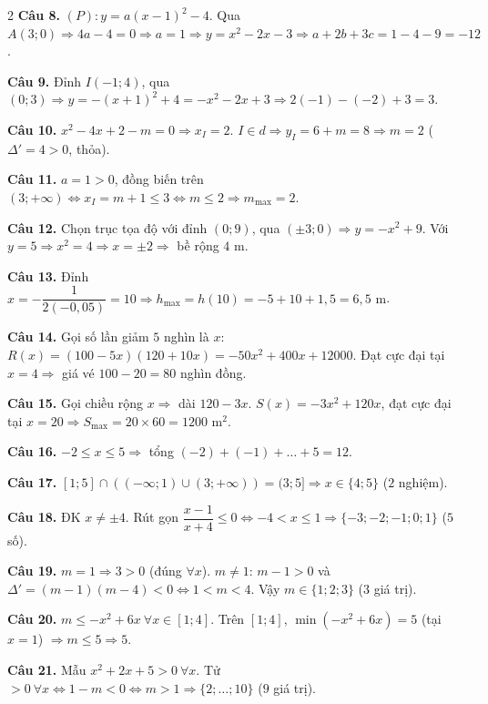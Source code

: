 \documentclass[12pt,a4paper]{article}
\begin{document}
\begin{multicols}{2}
\textbf{Câu 8.} $(P): y = a(x - 1)^2 - 4$. Qua $A(3; 0) \Rightarrow 4a - 4 = 0 \Rightarrow a = 1 \Rightarrow y = x^2 - 2x - 3 \Rightarrow a + 2b + 3c = 1 - 4 - 9 = -12$.

\textbf{Câu 9.} Đỉnh $I(-1; 4)$, qua $(0; 3) \Rightarrow y = -(x + 1)^2 + 4 = -x^2 - 2x + 3 \Rightarrow 2(-1) - (-2) + 3 = 3$.

\textbf{Câu 10.} $x^2 - 4x + 2 - m = 0 \Rightarrow x_I = 2$. $I \in d \Rightarrow y_I = 6 + m = 8 \Rightarrow m = 2$ ($\Delta' = 4 > 0$, thỏa).

\textbf{Câu 11.} $a = 1 > 0$, đồng biến trên $(3; +\infty) \Leftrightarrow x_I = m + 1 \le 3 \Leftrightarrow m \le 2 \Rightarrow m_{\max} = 2$.

\textbf{Câu 12.} Chọn trục tọa độ với đỉnh $(0; 9)$, qua $(\pm 3; 0) \Rightarrow y = -x^2 + 9$. Với $y = 5 \Rightarrow x^2 = 4 \Rightarrow x = \pm 2 \Rightarrow$ bề rộng $4\text{ m}$.

\textbf{Câu 13.} Đỉnh $x = -\dfrac{1}{2(-0{,}05)} = 10 \Rightarrow h_{\max} = h(10) = -5 + 10 + 1{,}5 = 6{,}5\text{ m}$.

\textbf{Câu 14.} Gọi số lần giảm $5$ nghìn là $x$: $R(x) = (100 - 5x)(120 + 10x) = -50x^2 + 400x + 12000$. Đạt cực đại tại $x = 4 \Rightarrow$ giá vé $100 - 20 = 80$ nghìn đồng.

\textbf{Câu 15.} Gọi chiều rộng $x \Rightarrow$ dài $120 - 3x$. $S(x) = -3x^2 + 120x$, đạt cực đại tại $x = 20 \Rightarrow S_{\max} = 20 \times 60 = 1200\text{ m}^2$.

\textbf{Câu 16.} $-2 \le x \le 5 \Rightarrow$ tổng $(-2) + (-1) + \dots + 5 = 12$.

\textbf{Câu 17.} $[1; 5] \cap ((-\infty; 1) \cup (3; +\infty)) = (3; 5] \Rightarrow x \in \{4; 5\}$ ($2$ nghiệm).

\textbf{Câu 18.} ĐK $x \ne \pm 4$. Rút gọn $\dfrac{x - 1}{x + 4} \le 0 \Leftrightarrow -4 < x \le 1 \Rightarrow \{-3; -2; -1; 0; 1\}$ ($5$ số).

\textbf{Câu 19.} $m = 1 \Rightarrow 3 > 0$ (đúng $\forall x$). $m \ne 1$: $m - 1 > 0$ và $\Delta' = (m-1)(m-4) < 0 \Leftrightarrow 1 < m < 4$. Vậy $m \in \{1; 2; 3\}$ ($3$ giá trị).

\textbf{Câu 20.} $m \le -x^2 + 6x\ \forall x \in [1; 4]$. Trên $[1; 4]$, $\min(-x^2 + 6x) = 5$ (tại $x=1$) $\Rightarrow m \le 5 \Rightarrow 5$.

\textbf{Câu 21.} Mẫu $x^2 + 2x + 5 > 0\ \forall x$. Tử $> 0\ \forall x \Leftrightarrow 1 - m < 0 \Leftrightarrow m > 1 \Rightarrow \{2;\dots;10\}$ ($9$ giá trị).


\end{multicols}
\end{document}
